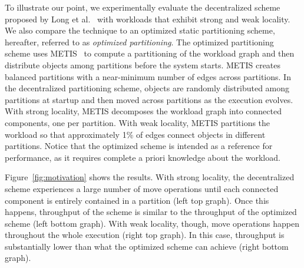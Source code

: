 To illustrate our point, we experimentally evaluate the decentralized scheme proposed by Long et al.~\cite{hoang2016} with workloads that exhibit strong and weak locality.
We also compare the technique to an optimized static partitioning scheme, hereafter, referred to as \emph{optimized partitioning}.
The optimized partitioning scheme uses METIS~\cite{Abou-Rjeili:2006} to compute a partitioning of the workload graph and then distribute objects among partitions before the system starts.
METIS creates balanced partitions with a near-minimum number of edges across partitions.
In the decentralized partitioning scheme, objects are randomly distributed among partitions at startup and then moved across partitions as the execution evolves.
With strong locality, METIS decomposes the workload graph into connected components, one per partition.
With weak locality, METIS partitions the workload so that approximately 1\% of edges connect objects in different partitions.
Notice that the optimized scheme is intended as a reference for performance, as it requires complete a priori knowledge about the workload.

Figure~\ref{fig:motivation} shows the results.
With strong locality, the decentralized scheme experiences a large number of move operations until each connected component is entirely contained in a partition (left top graph).
Once this happens, throughput of the scheme is similar to the throughput of the optimized scheme (left bottom graph).
With weak locality, though, move operations happen throughout the whole execution (right top graph).
In this case, throughput is substantially lower than what the optimized scheme can achieve (right bottom graph).

